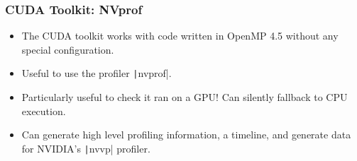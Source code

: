 \documentclass[aspectratio=169]{beamer}
\begin{document}
\begin{frame}
\frametitle{CUDA Toolkit: NVprof}
\begin{itemize}
  \item The CUDA toolkit works with code written in OpenMP 4.5 without any special configuration.
  \item Useful to use the profiler \texttt|nvprof|.
  \item Particularly useful to check it ran on a GPU! Can silently fallback to CPU execution.
  \item Can generate high level profiling information, a timeline, and generate data for NVIDIA's \texttt|nvvp| profiler.
\end{itemize}
\end{frame}
\end{document}
